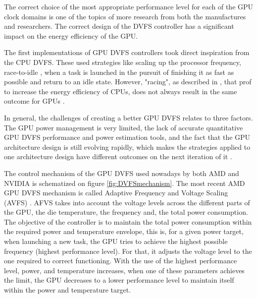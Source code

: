 The correct choice of the most appropriate performance level for each of the GPU clock domains is one of the topics of more research from both the manufactures and researchers. The correct design of the DVFS controller has a significant impact on the energy efficiency of the GPU.

The first implementations of GPU DVFS controllers took direct inspiration from the CPU DVFS. These used strategies like scaling up the processor frequency, race-to-idle \cite{hoffmann_racing_2013}, when a task is launched in the pursuit of finishing it as fast as possible and return to an idle state. However, "racing", as described in \cite{kim_racing_2015}, that prof to increase the energy efficiency of CPUs, does not always result in the same outcome for GPUs \cite{kim_racing_2015}.

In general, the challenges of creating a better GPU DVFS relates to three factors. The GPU power management is very limited, the lack of accurate quantitative GPU DVFS performance and power estimation tools, and the fact that the GPU architecture design is still evolving rapidly, which makes the strategies applied to one architecture design have different outcomes on the next iteration of it \cite{mei_survey_2016}.



The control mechanism of the GPU DVFS used nowadays by both AMD and NVIDIA is schematized on figure \ref{fig:DVFSmechanism}. The most recent AMD GPU DVFS mechanism is called Adaptive Frequency and Voltage Scaling (AVFS) \cite{amd_polaris_nodate}. AFVS takes into account the voltage levels across the different parts of the GPU, the die temperature, the frequency and, the total power consumption. The objective of the controller is to maintain the total power consumption within the required power and temperature envelope, this is, for a given power target, when launching a new task, the GPU tries to achieve the highest possible frequency (highest performance level). For that, it adjusts the voltage level to the one required to correct functioning. With the use of the highest performance level, power, and temperature increases, when one of these parameters achieves the limit, the GPU decreases to a lower performance level to maintain itself within the power and temperature target. 

